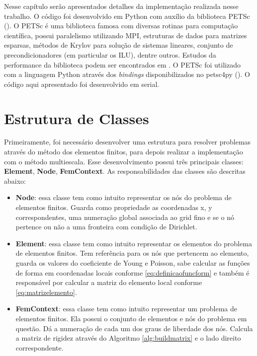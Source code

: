 Nesse capítulo serão apresentados detalhes da implementação realizada nesse trabalho. O código foi desenvolvido em Python com auxílio da biblioteca PETSc (\citet{petsc-user-ref}). O PETSc é uma biblioteca famosa com diversas rotinas para computação científica, possui paralelismo utilizando MPI, estruturas de dados para matrizes esparsas, métodos de Krylov para solução de sistemas lineares, conjunto de precondicionadores (em particular os ILU), dentre outros. Estudos da performance da biblioteca podem ser encontrados em \citet{petsc-efficient}. O PETSc foi utilizado com a linguagem Python através dos \textit{bindings} disponibilizados no petsc4py (\citet{Dalcin2011}). O código aqui apresentado foi desenvolvido em serial. 


\section{Estrutura de Classes}

Primeiramente, foi necessário desenvolver uma estrutura para resolver problemas através do método dos elementos finitos, para depois realizar a implementação com o método multiescala. Esse desenvolvimento possui três principais classes: \textbf{Element}, \textbf{Node}, \textbf{FemContext}. As responsabilidades das classes são descritas abaixo:

\begin{itemize}
    \item \textbf{Node}: essa classe tem como intuito representar os nós do problema de elementos finitos. Guarda como propriedade as coordenadas x, y correspondentes, uma numeração global associada ao grid fino e se o nó pertence ou não a uma fronteira com condição de Dirichlet.
    \item \textbf{Element}: essa classe tem como intuito representar os elementos do problema de elementos finitos. Tem referência para os nós que pertencem ao elemento, guarda os valores do coeficiente de Young e Poisson, sabe calcular as funções de forma em coordenadas locais conforme \eqref{eq:definicaofuncform} e também é responsável por calcular a matriz do elemento local conforme \eqref{eq:matrizelemento}.
    \item \textbf{FemContext}: essa classe tem como intuito representar um problema de elementos finitos. Ela possui o conjunto de elementos e nós do problema em questão. Dá a numeração de cada um dos graus de liberdade dos nós. Calcula a matriz de rigidez através do Algoritmo \ref{alg:buildmatrix} e o lado direito correspondente. 
\end{itemize}

